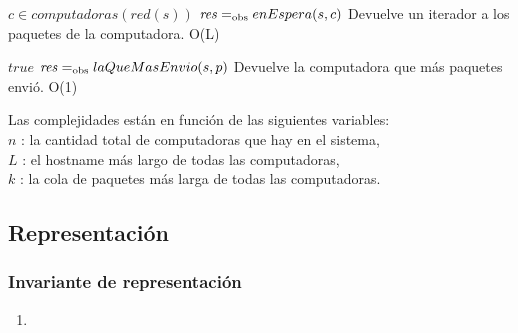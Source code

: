  {$c \in computadoras(red(s))$}
 {$\text{\textit{res}} =_{\mathrm{obs}} enEspera(s,c)$}
 {Devuelve un iterador a los paquetes de la computadora.}
 {O(L)}

 {$true$}
 {$\text{\textit{res}} =_{\mathrm{obs}} laQueMasEnvio(s,p)$}
 {Devuelve la computadora que más paquetes envió.}
 {O(1)}

Las complejidades están en función de las siguientes variables:\\
$n$ : la cantidad total de computadoras que hay en el sistema, \\
$L$ : el hostname más largo de todas las computadoras, \\
$k$ : la cola de paquetes más larga de todas las computadoras. 

\subsection{Representación}


\subsubsection*{Invariante de representación}

\begin{enumerate}
	\item 

\end{enumerate}

